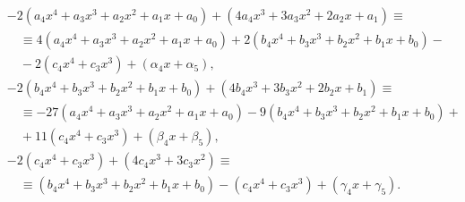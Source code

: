 \documentclass[11pt]{article}
\begin{document}
{\[
\begin{aligned}
&-2(a_4x^4 + a_3x^3 + a_2x^2 + a_1x + a_0) + (4a_4x^3 + 3a_3x^2 + 2a_2x + a_1) \equiv \\
&\quad \equiv4(a_4x^4 + a_3x^3 + a_2x^2 + a_1x + a_0) + 2(b_4x^4 + b_3x^3 + b_2x^2 + b_1x + b_0)- \\
&\quad - 2(c_4x^4 + c_3x^3) + (\alpha_4x + \alpha_5), \\
%
&-2(b_4x^4 + b_3x^3 + b_2x^2 + b_1x + b_0) + (4b_4x^3 + 3b_3x^2 + 2b_2x + b_1) \equiv \\
&\quad \equiv-27(a_4x^4 + a_3x^3 + a_2x^2 + a_1x + a_0) - 9(b_4x^4 + b_3x^3 + b_2x^2 + b_1x + b_0)+ \\
&\quad + 11(c_4x^4 + c_3x^3) + (\beta_4x + \beta_5), \\
%
&-2(c_4x^4 + c_3x^3) + (4c_4x^3 + 3c_3x^2) \equiv \\
&\quad \equiv(b_4x^4 + b_3x^3 + b_2x^2 + b_1x + b_0) - (c_4x^4 + c_3x^3) + (\gamma_4x + \gamma_5).
\end{aligned}
\]

}
\end{document}
